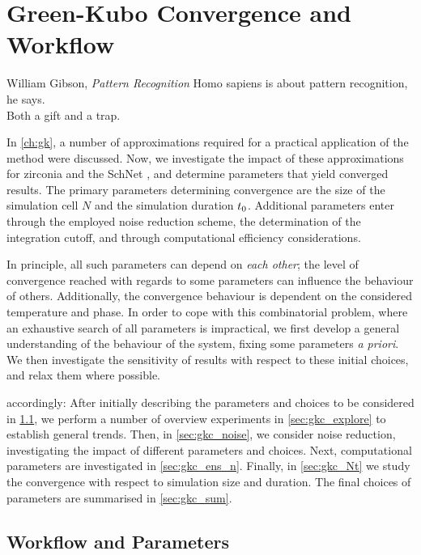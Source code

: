 
\chapter{Green-Kubo Convergence and Workflow}
\label{ch:gk-conv}

\begin{chapquote}{William Gibson, \textit{Pattern Recognition}}
  Homo sapiens is about pattern recognition, he says.\\ Both a gift and a trap.
\end{chapquote}

\noindent
In \cref{ch:gk}, a number of approximations required for a practical application of the \gk method were discussed. Now, we investigate the impact of these approximations for zirconia and the SchNet \mlp, and determine parameters that yield converged results.
The primary parameters determining convergence are the size of the simulation cell $N$ and the simulation duration $t_0$. Additional parameters enter through the employed noise reduction scheme, the determination of the integration cutoff, and through computational efficiency considerations.

In principle, all such parameters can depend on \emph{each other}; the level of convergence reached with regards to some parameters can influence the behaviour of others.
Additionally, the convergence behaviour is dependent on the considered temperature and phase.
In order to cope with this combinatorial problem, where an exhaustive search of all parameters is impractical, we first develop a general understanding of the behaviour of the system, fixing some parameters \emph{a priori}. We then investigate the sensitivity of results with respect to these initial choices, and relax them where possible.

 accordingly: After initially describing the parameters and choices to be considered in \cref{sec:gkc_params}, we perform a number of overview experiments in \cref{sec:gkc_explore} to establish general trends.
Then, in \cref{sec:gkc_noise}, we consider noise reduction, investigating the impact of different parameters and choices.
Next, computational parameters are investigated in \cref{sec:gkc_ens_n}.
Finally, in \cref{sec:gkc_Nt} we study the convergence with respect to simulation size and duration.
The final choices of parameters are summarised in \cref{sec:gkc_sum}.

\section{Workflow and Parameters}
\label{sec:gkc_params}

